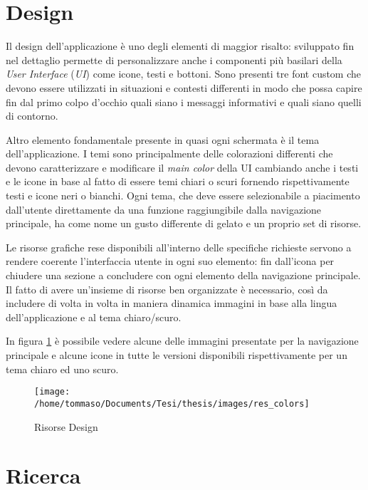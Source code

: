 \section{Design}

Il design dell'applicazione è uno degli elementi di maggior risalto:
sviluppato fin nel dettaglio permette di personalizzare anche i componenti
più basilari della \emph{User Interface} (\emph{UI}) come icone, testi
e bottoni. Sono presenti tre font custom che devono essere utilizzati
in situazioni e contesti differenti in modo che possa capire fin dal
primo colpo d'occhio quali siano i messaggi informativi e quali siano
quelli di contorno.\bigskip{}

Altro elemento fondamentale presente in quasi ogni schermata è il
tema dell'applicazione. I temi sono principalmente delle colorazioni
differenti che devono caratterizzare e modificare il \emph{main color}
della UI cambiando anche i testi e le icone in base al fatto di essere
temi chiari o scuri fornendo rispettivamente testi e icone neri o
bianchi. Ogni tema, che deve essere selezionabile a piacimento dall'utente
direttamente da una funzione raggiungibile dalla navigazione principale,
ha come nome un gusto differente di gelato e un proprio set di risorse.\bigskip{}

Le risorse grafiche rese disponibili all'interno delle specifiche
richieste servono a rendere coerente l'interfaccia utente in ogni
suo elemento: fin dall'icona per chiudere una sezione a concludere
con ogni elemento della navigazione principale. Il fatto di avere
un'insieme di risorse ben organizzate è necessario, così da includere
di volta in volta in maniera dinamica immagini in base alla lingua
dell'applicazione e al tema chiaro/scuro.

In figura \ref{fig:Risorse-Design} è possibile vedere alcune delle
immagini presentate per la navigazione principale e alcune icone in
tutte le versioni disponibili rispettivamente per un tema chiaro ed
uno scuro.\bigskip{}

\begin{figure}[H]
\texttt{[image: /home/tommaso/Documents/Tesi/thesis/images/res\_colors]}

\caption{\label{fig:Risorse-Design}Risorse Design}

\end{figure}


\section{Ricerca}

